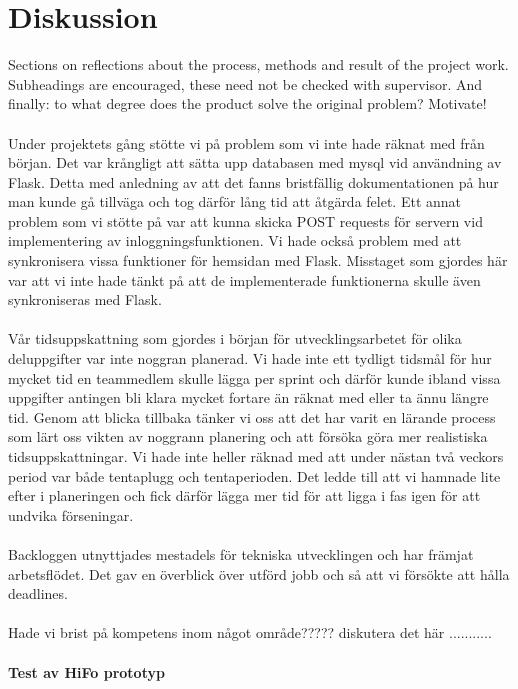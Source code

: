 \documentclass[12pt]{article}
\begin{document}
\section{Diskussion}
Sections on reflections about the process, methods and result of the project work. Subheadings are encouraged, these need not be checked with supervisor. And finally: to what degree does the product solve the original problem? Motivate!\\\\
Under projektets gång stötte vi på problem som vi inte hade räknat med från början. Det var krångligt att sätta upp databasen med mysql vid användning av Flask. Detta med anledning av att det fanns bristfällig dokumentationen på hur man kunde gå tillväga och tog därför lång tid att åtgärda felet. Ett annat problem som vi stötte på var att kunna skicka POST requests för servern vid implementering av inloggningsfunktionen. Vi hade också problem med att synkronisera vissa funktioner för hemsidan med Flask. Misstaget som gjordes här var att vi inte hade tänkt på att de implementerade funktionerna skulle även synkroniseras med Flask.\\\\
Vår tidsuppskattning som gjordes i början för utvecklingsarbetet för olika deluppgifter var inte noggran planerad. Vi hade inte ett tydligt tidsmål för hur mycket tid en teammedlem skulle lägga per sprint och därför kunde ibland vissa uppgifter antingen bli klara mycket fortare än räknat med eller ta ännu längre tid. Genom att blicka tillbaka tänker vi oss att det har varit en lärande process som lärt oss vikten av noggrann planering och att försöka göra mer realistiska tidsuppskattningar. Vi hade inte heller räknad med att under nästan två veckors period var både tentaplugg och tentaperioden. Det ledde till att vi hamnade lite efter i planeringen och fick därför lägga mer tid för att ligga i fas igen för att undvika förseningar.\\\\
Backloggen utnyttjades mestadels för tekniska utvecklingen och har främjat arbetsflödet. Det gav en överblick över utförd jobb och så att vi försökte att hålla deadlines.\\\\
Hade vi brist på kompetens inom något område????? diskutera det här ........... \\\\
\textbf{Test av HiFo prototyp }\\\
\end{document}
